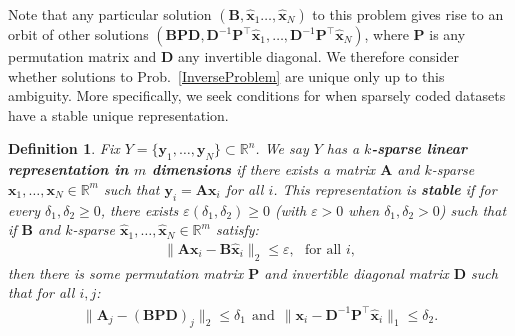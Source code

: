 \documentclass[9pt,twocolumn]{pnas-new}
\newtheorem{definition}{Definition}
\begin{document}
Note that any particular solution $(\mathbf{B}, \mathbf{\hat x}_1 \ldots, \mathbf{\hat x}_N)$ to this problem gives rise to an orbit of other solutions $(\mathbf{BPD}, \mathbf{D}^{-1}\mathbf{P}^{\top}\mathbf{\hat x}_1, \ldots, \mathbf{D}^{-1}\mathbf{P}^{\top}\mathbf{\hat x}_N)$, where $\mathbf{P}$ is any permutation matrix and $\mathbf{D}$ any invertible diagonal.  
We therefore consider whether solutions to Prob.~\ref{InverseProblem} are unique only up to this ambiguity.  More specifically, 
we seek conditions for when sparsely coded datasets have a stable unique representation.








 
 
\begin{definition}\label{maindef}
Fix $Y = \{ \mathbf{y}_1, \ldots, \mathbf{y}_N\} \subset \mathbb{R}^n$. We say $Y$ has a \textbf{$k$-sparse linear representation in $m$ dimensions} if there exists a matrix $\mathbf{A}$ and $k$-sparse $\mathbf{x}_1, \ldots, \mathbf{x}_N \in \mathbb{R}^m$ such that $\mathbf{y}_i = \mathbf{A}\mathbf{x}_i$ for all $i$. %
This representation is \textbf{stable} if for every $\delta_1, \delta_2 \geq 0$, there exists $\varepsilon(\delta_1, \delta_2) \geq 0$ (with $\varepsilon > 0$ when  $\delta_1, \delta_2 > 0$) such that if $\mathbf{B}$ and $k$-sparse $\mathbf{\hat x}_1, \ldots, \mathbf{\hat x}_N \in \mathbb{R}^m$ satisfy:
\begin{align*}
\|\mathbf{A}\mathbf{x}_i - \mathbf{B}\mathbf{\hat x}_i\|_2 \leq \varepsilon,\ \ \   \text{for all $i$},
\end{align*}
%
then there is some permutation matrix $\mathbf{P}$ and invertible diagonal matrix $\mathbf{D}$ such that for all $i, j$:
\begin{align}\label{def1}
\|\mathbf{A}_j - (\mathbf{BPD})_j\|_2 \leq \delta_1 \ \ \text{and} \ \ \|\mathbf{x}_i - \mathbf{D}^{-1}\mathbf{P}^{\top}\mathbf{\hat x}_i\|_1 \leq \delta_2.
\end{align}
\end{definition}
\end{document}
